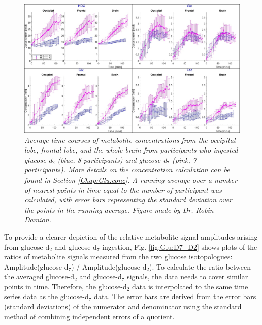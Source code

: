 \begin{figure}
    \centering
    \includegraphics[width = 1\textwidth]{Figures/Glucose/Avg_Conc.png}
    \caption{\textit{Average time-courses of metabolite concentrations from the occipital lobe, frontal lobe, and the whole brain from participants who ingested glucose-d$_2$ (blue, 8 participants) and glucose-d$_7$ (pink, 7 participants). More details on the concentration calculation can be found in Section \ref{Chap:Glu:conc}. A running average over a number of nearest points in time equal to the number of participant was calculated, with error bars representing the standard deviation over the points in the running average. Figure made by Dr. Robin Damion.}}
    \label{fig:Glu:Avg_Conc}
\end{figure}

To provide a clearer depiction of the relative metabolite signal amplitudes arising from glucose-d$_2$ and glucose-d$_7$ ingestion, Fig. \ref{fig:Glu:D7_D2} shows plots of the ratios of metabolite signals measured from the two glucose isotopologues: Amplitude(glucose-d$_7$) / Amplitude(glucose-d$_2$). To calculate the ratio between the averaged glucose-d$_2$ and glucose-d$_7$ signals, the data needs to cover similar points in time. Therefore, the glucose-d$_2$ data is interpolated to the same time series data as the glucose-d$_7$ data. The error bars are derived from the error bars (standard deviations) of the numerator and denominator using the standard method of combining independent errors of a quotient. 

